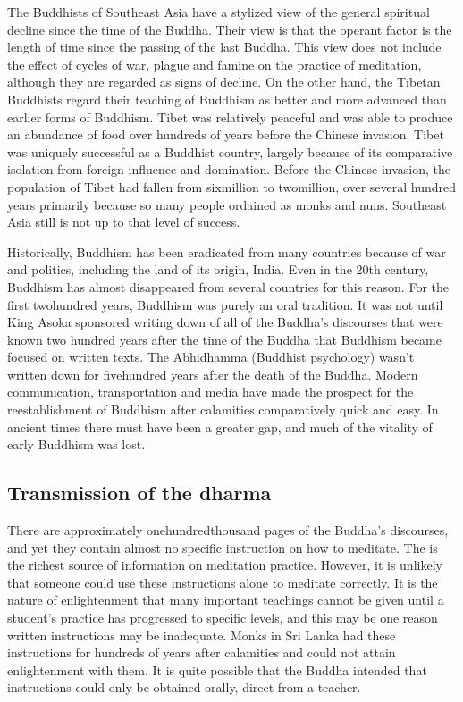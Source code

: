\documentclass[a5paper,10pt,english]{book}
\begin{document}
\sphinxAtStartPar
The Buddhists of Southeast Asia have a stylized view of the general
spiritual decline since the time of the Buddha. Their view is that the
operant factor is the length of time since the passing of the last
Buddha. This view does not include the effect of cycles of war, plague
and famine on the practice of meditation, although they are regarded as
signs of decline. On the other hand, the Tibetan Buddhists regard their
teaching of Buddhism as better and more advanced than earlier forms of
Buddhism. Tibet was relatively peaceful and was able to produce an
abundance of food over hundreds of years before the Chinese invasion.
Tibet was uniquely successful as a Buddhist country, largely because of
its comparative isolation from foreign influence and domination. Before
the Chinese invasion, the population of Tibet had fallen from
six\sphinxhyphen{}million to two\sphinxhyphen{}million, over several hundred years primarily because
so many people ordained as monks and nuns. Southeast Asia still is not
up to that level of success.

\sphinxAtStartPar
Historically, Buddhism has been eradicated from many countries because
of war and politics, including the land of its origin, India. Even in
the 20th century, Buddhism has almost disappeared from several countries
for this reason. For the first two\sphinxhyphen{}hundred years, Buddhism was purely an
oral tradition. It was not until King Asoka sponsored writing down of
all of the Buddha’s discourses that were known two hundred years after
the time of the Buddha that Buddhism became focused on written texts.
The Abhidhamma (Buddhist psychology) wasn’t written down for
five\sphinxhyphen{}hundred years after the death of the Buddha. Modern communication,
transportation and media have made the prospect for the reestablishment
of Buddhism after calamities comparatively quick and easy. In ancient
times there must have been a greater gap, and much of the vitality of
early Buddhism was lost.


\subsection{Transmission of the dharma}
\label{\detokenize{saints:transmission-of-the-dharma}}
\sphinxAtStartPar
There are approximately one\sphinxhyphen{}hundred\sphinxhyphen{}thousand pages of the Buddha’s
discourses, and yet they contain almost no specific instruction on how
to meditate. The  is the richest source of
information on meditation practice. However, it is unlikely that someone
could use these instructions alone to meditate correctly. It is the
nature of enlightenment that many important teachings cannot be given
until a student’s practice has progressed to specific levels, and this
may be one reason written instructions may be inadequate. Monks in Sri
Lanka had these instructions for hundreds of years after calamities and
could not attain enlightenment with them. It is quite possible that the
Buddha intended that instructions could only be obtained orally, direct
from a teacher.
\end{document}
